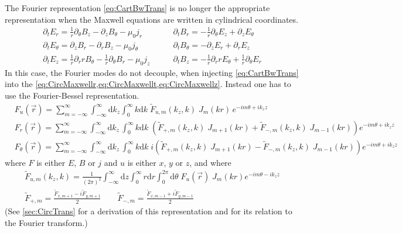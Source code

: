 \documentclass[a4paper]{article}   	%
\newcommand{\ir}{\frac{1}{r}}
\newcommand{\Integ}[1]{\int_{-\infty}^{\infty} \!\!\!\!\!
  \mathrm{d}#1}
\newcommand{\RInteg}[1]{\int_{0}^{\infty} \!\!\!\!\! #1\mathrm{d}#1}
\newcommand{\TInteg}[1]{\int_{0}^{2\pi} \!\!\!\!\! \mathrm{d}#1}
\begin{document}
The Fourier representation \cref{eq:CartBwTrans} is no longer the
appropriate representation when the Maxwell equations are written in cylindrical coordinates.
\begin{align}
\partial_t E_r = \ir \partial_\theta B_z - \partial_z B_\theta - \mu_0  j_r \qquad&   
\partial_t B_r = -\ir \partial_\theta E_z + \partial_z E_\theta \label{eq:CircMaxwellr} \\
\partial_t E_\theta = \partial_z B_r - \partial_r B_z - \mu_0  j_\theta \qquad &   
\partial_t B_\theta = -\partial_z E_r + \partial_r E_z \label{eq:CircMaxwellt}  \\
\partial_t E_z = \ir\partial_r r B_\theta - \ir\partial_\theta B_r - \mu_0  j_z \qquad &   
\partial_t B_z = -\ir\partial_r r E_\theta + \ir\partial_\theta E_r \label{eq:CircMaxwellz} 
\end{align}
In this case, the Fourier modes do not decouple, when injecting
\cref{eq:CartBwTrans} into the \cref{eq:CircMaxwellr,eq:CircMaxwellt,eq:CircMaxwellz}. Instead one has to use the Fourier-Bessel representation.
\begin{align}
& F_u(\vec{r}) = \sum_{m=-\infty}^{\infty} \Integ{k_z}
\RInteg{k}\; \tilde{F}_{u,m}(k_z,k) \; J_m(kr)\, e^{-im\theta + ik_z z} 
\label{eq:CircBwTransu} \\
& F_r(\vec{r}) = \sum_{m=-\infty}^{\infty} \Integ{k_z}\,\RInteg{k}\;
\left( \tilde{F}_{+,m}(k_z,k)\; J_{m+1}(kr) +\tilde{F}_{-,m}(k_z,k)\; J_{m-1}(kr)
\right)  e^{-im\theta +ik_z z}
\label{eq:CircBwTransr} \\
& F_\theta(\vec{r}) = \sum_{m=-\infty}^{\infty} \Integ{k_z}\,\RInteg{k}\;
i\left( \tilde{F}_{+,m}(k_z,k)\; J_{m+1}(kr) - \tilde{F}_{-,m}(k_z,k)\; J_{m-1}(kr)
\right)  e^{-im\theta +ik_z z} 
\label{eq:CircBwTranst}
\end{align}
where $F$ is either $E$, $B$ or $j$ and $u$ is either $x$, $y$ or $z$,
and where
\begin{align}
\tilde{F}_{u,m}(k_z,k) = \frac{1}{(2\pi)^2} \Integ{z} \RInteg{r}
\TInteg{\theta} \;F_u(\vec{r})\; J_m(kr) e^{-im\theta
 - i k_z z} \label{eq:CircFwTransu} \\
\tilde{F}_{+,m} = \frac{\tilde{F}_{x,m+1} -
    i\tilde{F}_{y,m+1}}{2} \qquad \tilde{F}_{-,m} = \frac{\tilde{F}_{x,m-1} +
    i\tilde{F}_{y,m-1}}{2}
\label{eq:CircFwTranspm} 
\end{align}
\noindent (See \cref{sec:CircTrans} for a derivation of this representation and
 for its relation to the Fourier transform.)
\end{document}
